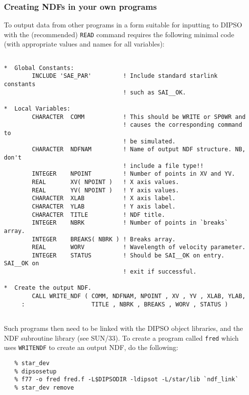 \documentclass[twoside,11pt]{article}
\newcommand{\htmlref}[2]{#1}
\newcommand{\xref}[3]{#1}
\renewcommand{\_}{\texttt{\symbol{95}}}
\begin{document}
\subsubsection{Creating NDFs in your own programs}

To output data from other programs in a form suitable for inputting to DIPSO
with the (recommended) \htmlref{{\tt{READ}}}{COM:READ}  command requires the following minimal code (with
appropriate values and names for all variables):

\begin{small}
\begin{verbatim}

*  Global Constants:
        INCLUDE 'SAE_PAR'         ! Include standard starlink constants
                                  ! such as SAI__OK.

*  Local Variables:
        CHARACTER  COMM           ! This should be WRITE or SP0WR and
                                  ! causes the corresponding command to
                                  ! be simulated.
        CHARACTER  NDFNAM         ! Name of output NDF structure. NB, don't
                                  ! include a file type!!
        INTEGER    NPOINT         ! Number of points in XV and YV.
        REAL       XV( NPOINT )   ! X axis values.
        REAL       YV( NPOINT )   ! Y axis values.
        CHARACTER  XLAB           ! X axis label.
        CHARACTER  YLAB           ! Y axis label.
        CHARACTER  TITLE          ! NDF title.
        INTEGER    NBRK           ! Number of points in `breaks` array.
        INTEGER    BREAKS( NBRK ) ! Breaks array.
        REAL       WORV           ! Wavelength of velocity parameter.
        INTEGER    STATUS         ! Should be SAI__OK on entry. SAI__OK on 
                                  ! exit if successful.

*  Create the output NDF.	
        CALL WRITE_NDF ( COMM, NDFNAM, NPOINT , XV , YV , XLAB, YLAB,
     :                   TITLE , NBRK , BREAKS , WORV , STATUS )


\end{verbatim}
\end{small}

Such programs then need to be linked with the DIPSO object libraries, and
the NDF subroutine library (see \xref{SUN/33}{sun33}{}). To create a
program called {\tt fred} which uses {\tt WRITE\_NDF} to create an output
NDF, do the following:

\begin{verbatim}
   % star_dev
   % dipsosetup
   % f77 -o fred fred.f -L$DIPSODIR -ldipsot -L/star/lib `ndf_link`
   % star_dev remove
\end{verbatim}
\end{document}
